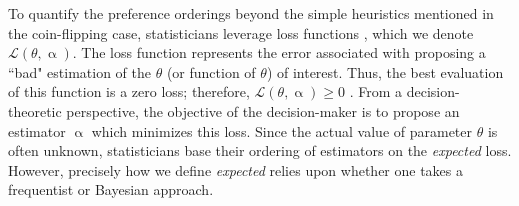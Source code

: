 \documentclass[letterpaper,12pt]{article}
\begin{document}
To quantify the preference orderings beyond the simple heuristics mentioned in the coin-flipping case, statisticians leverage loss functions  \cite{wald1950}, which we denote $\mathcal{L}(\theta, \upalpha)$. The loss function represents the error associated with proposing a ``bad" estimation of the $\theta$ (or function of $\theta$) of interest. Thus, the best evaluation of this function is a zero loss; therefore, $\mathcal{L}(\theta, \upalpha) \geq 0$ \cite{robert2007bayesian}. From a decision-theoretic perspective, the objective of the decision-maker is to propose an estimator $\upalpha$ which minimizes this loss. Since the actual value of parameter $\theta$ is often unknown, statisticians base their ordering of estimators on the \textit{expected} loss. However, precisely how we define \textit{expected} relies upon whether one takes a {frequentist} or {Bayesian} approach. 
\end{document}
